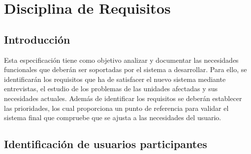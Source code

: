 
\chapter{Disciplina de Requisitos}
\label{chap:requisito}

\section{Introducción}

Esta especificación tiene como objetivo analizar y documentar las necesidades funcionales que deberán ser soportadas por el sistema a desarrollar. Para ello, se identificarán los requisitos que ha de satisfacer el nuevo sistema mediante entrevistas, el estudio de los problemas de las unidades afectadas y sus necesidades actuales. Además de identificar los requisitos se deberán establecer las prioridades, los cual proporciona un punto de referencia para validar el sistema final que compruebe que se ajusta a las necesidades del usuario.

\section{Identificación de usuarios participantes}

